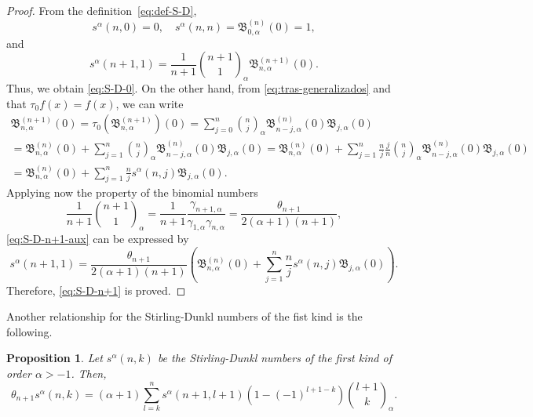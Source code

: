 \documentclass[11pt,a4paper]{article}
\theoremstyle{plain}
\newtheorem{proposition}[theorem]{Proposition}
\theoremstyle{remark}
\newcommand{\binoma}[2]{\binom{#1}{#2}_{\!\alpha}}
\newcommand{\B}{\mathfrak{B}}
\begin{document}
\begin{proof}
From the definition~\eqref{eq:def-S-D},
\[
  s^{\alpha}(n,0)=0,\quad s^{\alpha}(n,n) = \B_{0,\alpha}^{(n)}(0) = 1,
\]
and
\begin{equation}
\label{eq:S-D-n+1-aux}
  s^{\alpha}(n+1,1) = \frac{1}{n+1} \binoma{n+1}{1} \B_{n,\alpha}^{(n+1)}(0).
\end{equation}
Thus, we obtain \eqref{eq:S-D-0}. On the other hand, from \eqref{eq:tras-generalizados} and that $\tau_0f(x)=f(x)$, we can write
\begin{gather*}
  \B_{n,\alpha}^{(n+1)}(0) = \tau_0(\B_{n,\alpha}^{(n+1)})(0)
  = \sum_{j=0}^n\binoma{n}{j}\B_{n-j,\alpha}^{(n)}(0)\B_{j,\alpha}(0) \\
  = \B_{n,\alpha}^{(n)}(0) + \sum_{j=1}^{n} \binoma{n}{j}\B_{n-j,\alpha}^{(n)}(0) \B_{j,\alpha}(0)
  = \B_{n,\alpha}^{(n)}(0) + \sum_{j=1}^{n} \frac{n}{j} \frac{j}{n} 
  \binoma{n}{j} \B_{n-j,\alpha}^{(n)}(0) \B_{j,\alpha}(0) \\
  = \B_{n,\alpha}^{(n)}(0) + \sum_{j=1}^{n} \frac{n}{j} s^{\alpha}(n,j) \B_{j,\alpha}(0).
\end{gather*}
Applying now the property of the binomial numbers
\[
  \frac{1}{n+1}\binoma{n+1}{1} 
  = \frac{1}{n+1}\frac{\gamma_{n+1,\alpha}}{\gamma_{1,\alpha}\gamma_{n,\alpha}}
  = \frac{\theta_{n+1}}{2(\alpha+1)(n+1)},
\]
  \eqref{eq:S-D-n+1-aux} can be expressed by
\[
  s^{\alpha}(n+1,1) = \frac{\theta_{n+1}}{2(\alpha+1)(n+1)}
  \left(\B_{n,\alpha}^{(n)}(0)
  + \sum_{j=1}^{n} \frac{n}{j}s^{\alpha}(n,j) \B_{j,\alpha}(0)\right).
\]
Therefore, \eqref{eq:S-D-n+1} is proved.
\end{proof}

Another relationship for the Stirling-Dunkl numbers of the fist kind is the following. 

\begin{proposition}
\label{prop:proptSa} 
Let $s^{\alpha}(n,k)$ be the Stirling-Dunkl numbers of the first kind of order $\alpha>-1$. Then,
\[
  \theta_{n+1}s^{\alpha}(n,k) 
  = (\alpha+1) \sum_{l=k}^n s^{\alpha}(n+1,l+1)(1-(-1)^{l+1-k}) \binoma{l+1}{k}.
\]
\end{proposition}
\end{document}
